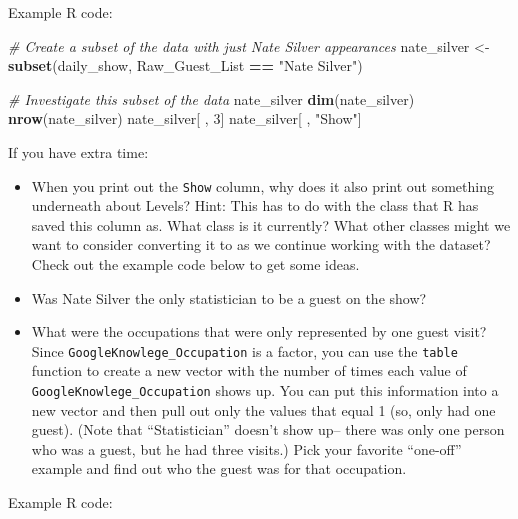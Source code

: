 \documentclass[]{book}
\makeatletter
\newenvironment{Shaded}{\begin{snugshade}}{\end{snugshade}}
\newcommand{\KeywordTok}[1]{\textcolor[rgb]{0.13,0.29,0.53}{\textbf{#1}}}
\newcommand{\DecValTok}[1]{\textcolor[rgb]{0.00,0.00,0.81}{#1}}
\newcommand{\StringTok}[1]{\textcolor[rgb]{0.31,0.60,0.02}{#1}}
\newcommand{\CommentTok}[1]{\textcolor[rgb]{0.56,0.35,0.01}{\textit{#1}}}
\newcommand{\OperatorTok}[1]{\textcolor[rgb]{0.81,0.36,0.00}{\textbf{#1}}}
\newcommand{\NormalTok}[1]{#1}
\providecommand{\tightlist}{%
  \setlength{\itemsep}{0pt}\setlength{\parskip}{0pt}}
\newenvironment{kframe}{%
\medskip{}
\setlength{\fboxsep}{.8em}
 \def\at@end@of@kframe{}%
 \ifinner\ifhmode%
  \def\at@end@of@kframe{\end{minipage}}%
  \begin{minipage}{\columnwidth}%
 \fi\fi%
 \def\FrameCommand##1{\hskip\@totalleftmargin \hskip-\fboxsep
 \colorbox{shadecolor}{##1}\hskip-\fboxsep
     \hskip-\linewidth \hskip-\@totalleftmargin \hskip\columnwidth}%
 \MakeFramed {\advance\hsize-\width
   \@totalleftmargin\z@ \linewidth\hsize
   \@setminipage}}%
 {\par\unskip\endMakeFramed%
 \at@end@of@kframe}
\renewenvironment{Shaded}{\begin{kframe}}{\end{kframe}}
\theoremstyle{definition}
\theoremstyle{definition}
\theoremstyle{definition}
\theoremstyle{remark}
\makeatother
\begin{document}
Example R code:

\begin{Shaded}
\begin{Highlighting}[]
\CommentTok{# Create a subset of the data with just Nate Silver appearances}
\NormalTok{nate_silver <-}\StringTok{ }\KeywordTok{subset}\NormalTok{(daily_show, }
\NormalTok{                      Raw_Guest_List }\OperatorTok{==}\StringTok{ "Nate Silver"}\NormalTok{)}

\CommentTok{# Investigate this subset of the data}
\NormalTok{nate_silver}
\KeywordTok{dim}\NormalTok{(nate_silver)}
\KeywordTok{nrow}\NormalTok{(nate_silver)}
\NormalTok{nate_silver[ , }\DecValTok{3}\NormalTok{]}
\NormalTok{nate_silver[ , }\StringTok{"Show"}\NormalTok{]}
\end{Highlighting}
\end{Shaded}

If you have extra time:

\begin{itemize}
\tightlist
\item
  When you print out the \texttt{Show} column, why does it also print
  out something underneath about Levels? Hint: This has to do with the
  class that R has saved this column as. What class is it currently?
  What other classes might we want to consider converting it to as we
  continue working with the dataset? Check out the example code below to
  get some ideas.
\item
  Was Nate Silver the only statistician to be a guest on the show?
\item
  What were the occupations that were only represented by one guest
  visit? Since \texttt{GoogleKnowlege\_Occupation} is a factor, you can
  use the \texttt{table} function to create a new vector with the number
  of times each value of \texttt{GoogleKnowlege\_Occupation} shows up.
  You can put this information into a new vector and then pull out only
  the values that equal 1 (so, only had one guest). (Note that
  ``Statistician'' doesn't show up-- there was only one person who was a
  guest, but he had three visits.) Pick your favorite ``one-off''
  example and find out who the guest was for that occupation.
\end{itemize}

Example R code:

\begin{Shaded}
\end{Shaded}
\end{document}
